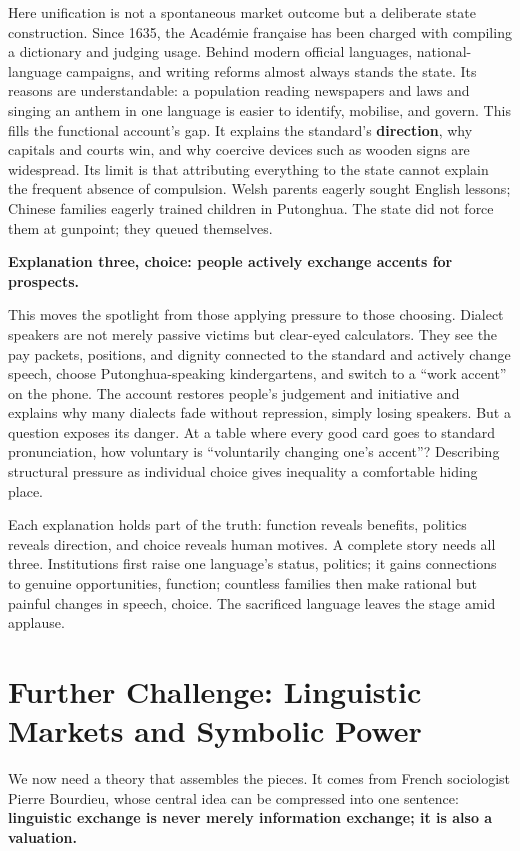 Here unification is not a spontaneous market outcome but a deliberate state construction. Since 1635, the Académie française has been charged with compiling a dictionary and judging usage. Behind modern official languages, national-language campaigns, and writing reforms almost always stands the state. Its reasons are understandable: a population reading newspapers and laws and singing an anthem in one language is easier to identify, mobilise, and govern. This fills the functional account's gap. It explains the standard's \textbf{direction}, why capitals and courts win, and why coercive devices such as wooden signs are widespread. Its limit is that attributing everything to the state cannot explain the frequent absence of compulsion. Welsh parents eagerly sought English lessons; Chinese families eagerly trained children in Putonghua. The state did not force them at gunpoint; they queued themselves.

\textbf{Explanation three, choice: people actively exchange accents for prospects.}

This moves the spotlight from those applying pressure to those choosing. Dialect speakers are not merely passive victims but clear-eyed calculators. They see the pay packets, positions, and dignity connected to the standard and actively change speech, choose Putonghua-speaking kindergartens, and switch to a ``work accent'' on the phone. The account restores people's judgement and initiative and explains why many dialects fade without repression, simply losing speakers. But a question exposes its danger. At a table where every good card goes to standard pronunciation, how voluntary is ``voluntarily changing one's accent''? Describing structural pressure as individual choice gives inequality a comfortable hiding place.

Each explanation holds part of the truth: function reveals benefits, politics reveals direction, and choice reveals human motives. A complete story needs all three. Institutions first raise one language's status, politics; it gains connections to genuine opportunities, function; countless families then make rational but painful changes in speech, choice. The sacrificed language leaves the stage amid applause.

\section[Further Challenge: Language and Power]{Further Challenge: Linguistic Markets and Symbolic Power}
We now need a theory that assembles the pieces. It comes from French sociologist Pierre Bourdieu, whose central idea can be compressed into one sentence: \textbf{linguistic exchange is never merely information exchange; it is also a valuation.}

